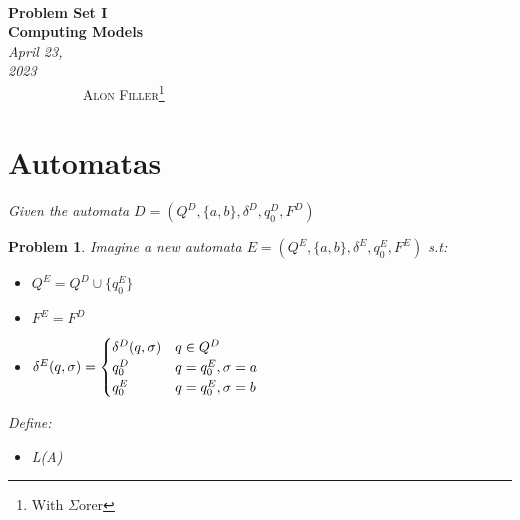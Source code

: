 \documentclass[12pt]{article}
\renewcommand{\=}[1]{\stackrel{#1}{=}} %
\newtheorem{p}{Problem}[section]
\theoremstyle{definition}
\begin{document}
{\noindent\Huge\bf  \\[0.5\baselineskip] {\selectfont  Problem Set I}         }\\[2\baselineskip] %
{ {\bf {}\selectfont Computing Models}\\ {\textit{\selectfont     April 23, 2023}}}~~~~~~~~~~~~~~~~~~~~~~~~~~~~~~~~~~~~~~~~~~~~~~~~~~~~~~~~~~~~~~~~~~~~~~~~~~~~~    {\large \textsc{Alon Filler}\footnote{With $\Sigma$orer}} %
\\[1.4\baselineskip] 



\section{Automatas}
\emph{Given the automata $D = (Q^{D}, \{a,b\}, \delta^{D}, q_0^{D}, F^{D})$} \newline
\begin{p}
\emph{\newline Imagine a new automata $E = (Q^{E}, \{a,b\}, \delta^{E}, q_0^{E}, F^{E})$} s.t:
\begin{itemize}
  \item $Q^{E} = Q^{D} \cup \{q_0^{E}\}$
  \item $F^{E} = F^{D}$
  \item \(
    \hspace{0mm}
    \delta^{E}(q, \sigma) = 
    \begin{cases}
      \delta^{D}(q, \sigma) & q \in Q^{D} \\
        q_0^{D} & q = q_0^{E}, \sigma = a \\ 
        q_0^{E} & q = q_0^{E}, \sigma = b
    \end{cases}
  \)
\end{itemize}

Define: 
\begin{itemize}
  \item L(A)
\end{itemize}
\end{p}
\end{document}
